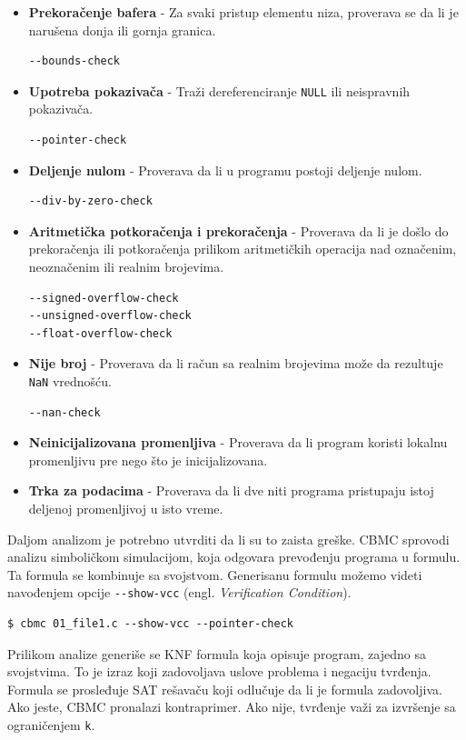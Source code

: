 \begin{itemize}
\tightlist
\item
  \textbf{Prekoračenje bafera} - Za svaki pristup elementu niza, proverava se da li je narušena donja ili gornja granica.
\begin{verbatim}
--bounds-check
\end{verbatim}
\item
  \textbf{Upotreba pokazivača} - Traži dereferenciranje \texttt{NULL} ili neispravnih pokazivača.
\begin{verbatim}
--pointer-check
\end{verbatim}
\item
  \textbf{Deljenje nulom} - Proverava da li u programu postoji deljenje nulom.
\begin{verbatim}
--div-by-zero-check
\end{verbatim}
\item
  \textbf{Aritmetička potkoračenja i prekoračenja} - Proverava da li je došlo do prekoračenja ili potkoračenja prilikom aritmetičkih operacija nad označenim, neoznačenim ili realnim brojevima.
\begin{verbatim}
--signed-overflow-check
--unsigned-overflow-check
--float-overflow-check
\end{verbatim}
\item
  \textbf{Nije broj} - Proverava da li račun sa realnim brojevima može da rezultuje \texttt{NaN} vrednošću.
\begin{verbatim}
--nan-check
\end{verbatim}
\item
  \textbf{Neinicijalizovana promenljiva} - Proverava da li program koristi lokalnu promenljivu pre nego što je inicijalizovana.
\item
  \textbf{Trka za podacima} - Proverava da li dve niti programa pristupaju istoj deljenoj promenljivoj u isto vreme.
\end{itemize}

Daljom analizom je potrebno utvrditi da li su to zaista greške. CBMC sprovodi analizu simboličkom simulacijom, koja odgovara prevođenju programa u formulu. Ta formula se kombinuje sa svojstvom. Generisanu formulu možemo videti navođenjem opcije \texttt{-{}-show-vcc} (engl. \emph{Verification Condition}).

\begin{verbatim}
$ cbmc 01_file1.c --show-vcc --pointer-check
\end{verbatim}

Prilikom analize generiše se KNF formula koja opisuje program, zajedno sa svojstvima. To je izraz koji zadovoljava uslove problema i negaciju tvrđenja. Formula se prosleđuje SAT rešavaču koji odlučuje da li je formula zadovoljiva. Ako jeste, CBMC pronalazi kontraprimer. Ako nije, tvrđenje važi za izvršenje sa ograničenjem \texttt{k}.


